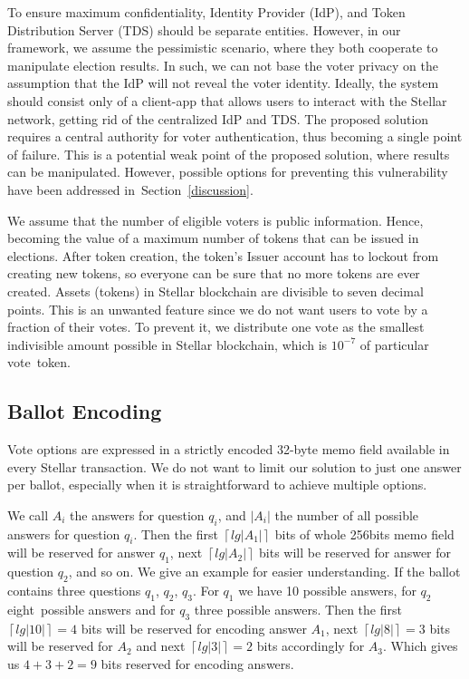\documentclass[applsci,article,accept,moreauthors,pdftex]{Definitions/mdpi}
\newcommand{\ceil}[1]{\left\lceil #1 \right\rceil}
\begin{document}
To ensure maximum confidentiality, Identity Provider (IdP), and Token Distribution Server (TDS) should be separate entities. However, in our framework, we assume the pessimistic scenario, where they both cooperate to manipulate election results. In such, we can not base the voter privacy on the assumption that the IdP will not reveal the voter identity.
Ideally, the system should consist only of a client-app that allows users to interact with the Stellar network, getting rid of the centralized IdP and TDS. 
The proposed solution requires a central authority for voter authentication, thus becoming a single point of failure. 
This is a potential weak point of the proposed solution, where results can be manipulated. However, possible options for preventing this vulnerability have been addressed in~Section~\ref{discussion}.


We assume that the number of eligible voters is public information. 
Hence, becoming the value of a maximum number of tokens that can be issued in elections. 
After token creation, the token's Issuer account has to lockout from creating new tokens, so everyone can be sure that no more tokens are ever created.
Assets (tokens) in Stellar blockchain are divisible to seven decimal points. 
This is an unwanted feature since we do not want users to vote by a fraction of their votes.
To prevent it, we distribute one vote as the smallest indivisible amount possible in Stellar blockchain, which is $10^{-7}$ of particular vote~token.


\subsection{Ballot Encoding}
Vote options are expressed in a strictly encoded 32-byte memo field available in every Stellar transaction. We do not want to limit our solution to just one answer per ballot, especially when it is straightforward to achieve multiple options. 

We call $A_i$ the answers for question $q_i$, and $|A_i|$ the number of all possible answers for question $q_i$. Then the first $\ceil{lg{|A_1|}}$ bits of whole 256bits memo field will be reserved for answer $q_1$, next $\ceil{lg{|A_2|}}$ bits will be reserved for answer for question $q_2$, and so on. We give an example for easier understanding. If the ballot contains three questions $q_1$, $q_2$, $q_3$. For $q_1$ we have 10 possible answers, for $q_2$ eight~possible answers and for $q_3$ three possible answers. Then the first $\ceil{lg{|10|}} = 4$ bits will be reserved for encoding answer $A_1$, next $\ceil{lg{|8|}} = 3$ bits will be reserved for $A_2$ and next $\ceil{lg{|3|}} = 2$ bits accordingly for $A_3$. Which gives us $4 + 3 + 2 = 9$ bits reserved for encoding answers. 
\end{document}
